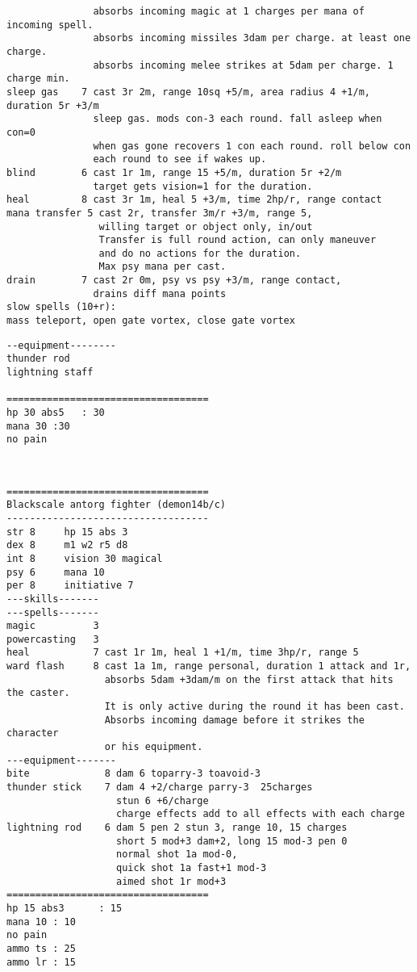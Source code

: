 \begin{samepage}
\begin{verbatim}
               absorbs incoming magic at 1 charges per mana of incoming spell.
               absorbs incoming missiles 3dam per charge. at least one charge.
               absorbs incoming melee strikes at 5dam per charge. 1 charge min.
sleep gas    7 cast 3r 2m, range 10sq +5/m, area radius 4 +1/m, duration 5r +3/m
               sleep gas. mods con-3 each round. fall asleep when con=0
               when gas gone recovers 1 con each round. roll below con
               each round to see if wakes up.
blind        6 cast 1r 1m, range 15 +5/m, duration 5r +2/m
               target gets vision=1 for the duration.
heal         8 cast 3r 1m, heal 5 +3/m, time 2hp/r, range contact
mana transfer 5 cast 2r, transfer 3m/r +3/m, range 5,
                willing target or object only, in/out
                Transfer is full round action, can only maneuver
                and do no actions for the duration.
                Max psy mana per cast.
drain        7 cast 2r 0m, psy vs psy +3/m, range contact,
               drains diff mana points
slow spells (10+r):
mass teleport, open gate vortex, close gate vortex
\end{verbatim} \end{samepage} \goodbreak \begin{samepage} \begin{verbatim}
--equipment--------
thunder rod
lightning staff

===================================
hp 30 abs5   : 30
mana 30 :30
no pain
\end{verbatim} \normalsize \end{samepage}

\

\goodbreak \begin{samepage} \small \begin{verbatim}
===================================
Blackscale antorg fighter (demon14b/c)
-----------------------------------
str 8     hp 15 abs 3
dex 8     m1 w2 r5 d8
int 8     vision 30 magical
psy 6     mana 10
per 8     initiative 7
---skills-------
---spells-------
magic          3
powercasting   3
heal           7 cast 1r 1m, heal 1 +1/m, time 3hp/r, range 5
ward flash     8 cast 1a 1m, range personal, duration 1 attack and 1r,
                 absorbs 5dam +3dam/m on the first attack that hits the caster.
                 It is only active during the round it has been cast.
                 Absorbs incoming damage before it strikes the character
                 or his equipment.
---equipment-------
bite             8 dam 6 toparry-3 toavoid-3
thunder stick    7 dam 4 +2/charge parry-3  25charges
                   stun 6 +6/charge
                   charge effects add to all effects with each charge
lightning rod    6 dam 5 pen 2 stun 3, range 10, 15 charges
                   short 5 mod+3 dam+2, long 15 mod-3 pen 0
                   normal shot 1a mod-0,
                   quick shot 1a fast+1 mod-3
                   aimed shot 1r mod+3
===================================
hp 15 abs3      : 15
mana 10 : 10
no pain
ammo ts : 25
ammo lr : 15
\end{verbatim} \normalsize \end{samepage}

